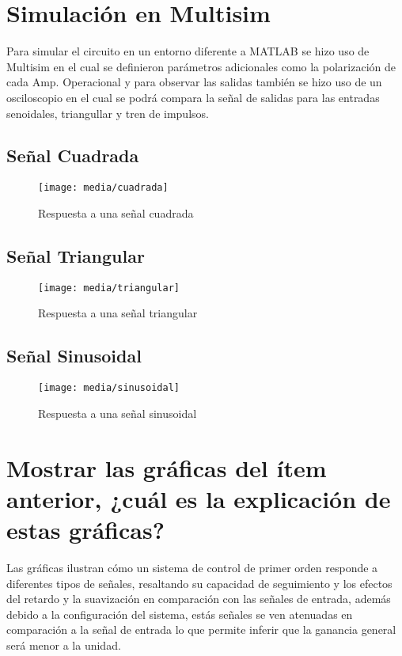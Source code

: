 \documentclass[conference]{IEEEtran}
\begin{document}
	\section{Simulación en Multisim}
	Para simular el circuito en un entorno diferente a MATLAB se hizo uso de Multisim en el cual se definieron parámetros adicionales como la polarización de cada Amp. Operacional y para observar las salidas también se hizo uso de un osciloscopio en el cual se podrá compara la señal de salidas para las entradas senoidales, triangullar y tren de impulsos.
	
	\subsection{Señal Cuadrada}
	
	\begin{figure}[h]
		\centering
		\texttt{[image: media/cuadrada]}
		\caption{Respuesta a una señal cuadrada}
		\label{fig:cuadrada}
	\end{figure}
	
	\subsection{Señal Triangular}
	
	\begin{figure}[h]
		\centering
		\texttt{[image: media/triangular]}
		\caption{Respuesta a una señal triangular}
		\label{fig:triangular}
	\end{figure}
	
	\subsection{Señal Sinusoidal}
	
	\begin{figure}
		\centering
		\texttt{[image: media/sinusoidal]}
		\caption{Respuesta a una señal sinusoidal}
		\label{fig:sinusoidal}
	\end{figure}
	
	\section{Mostrar las gráficas del ítem anterior, ¿cuál es la explicación de estas gráficas?}
	Las gráficas ilustran cómo un sistema de control de primer orden responde a diferentes tipos de señales, resaltando su capacidad de seguimiento y los efectos del retardo y la suavización en comparación con las señales de entrada, además debido a la configuración del sistema, estás señales se ven atenuadas en comparación a la señal de entrada lo que permite inferir que la ganancia general será menor a la unidad.
	
	
	
	
\end{document}
